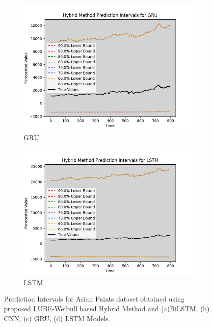 \begin{figure}[H]
\begin{minipage}{0.45\textwidth}
\begin{subfigure}[b]{\textwidth}
        \end{subfigure}
        \begin{subfigure}[b]{\textwidth}
            \centering
            \includegraphics[width=\textwidth]{Chap03/figs/GRU_hybrid_method_plot_AsianPaint_Method2.png}
            \caption{GRU.}
        \end{subfigure}
        \begin{subfigure}[b]{\textwidth}
            \centering
            \includegraphics[width=\textwidth]{Chap03/figs/LSTM_hybrid_method_plot_AsianPaint_Method2.png}
            \caption{LSTM.}
        \end{subfigure}
        \caption{Prediction Intervals for Asian Paints dataset obtained using proposed LUBE-Weibull based Hybrid Method and (a)BiLSTM, (b) CNN, (c) GRU, (d) LSTM Models.}
        \label{F 4.2}
    \end{minipage}
\end{figure}



